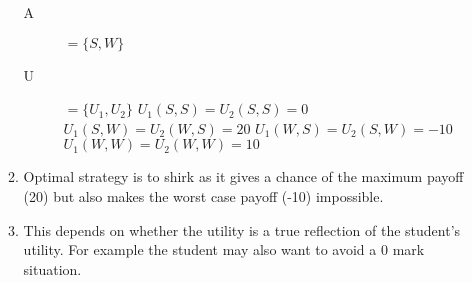 \documentclass[a4paper]{article}
\begin{document}
\begin{enumerate}
\begin{enumerate}
\begin{description}
				\item[A] \( = \lbrace S, W\rbrace \)
				\item[U] \( = \lbrace U_1, U_2 \rbrace \) \newline
				\( U_1(S, S) = U_2(S, S) = 0 \) \newline
				\( U_1(S, W) = U_2(W, S) = 20 \) \newline
				\( U_1(W, S) = U_2(S, W) = -10 \) \newline
				\( U_1(W, W) = U_2(W, W) = 10 \) \newline
			\end{description}
			\item Optimal strategy is to shirk as it gives a chance of the maximum payoff (20) but also makes the worst case payoff (-10) impossible.
			\item This depends on whether the utility is a true reflection of the student's utility. For example the student may also want to avoid a 0 mark situation.
		\end{enumerate}
\end{enumerate}
\end{document}
